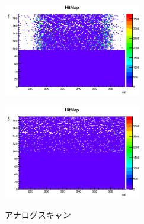 \begin{figure}[h]
  \centering
  \begin{minipage}[b]{0.4\linewidth}
    \centering
    \includegraphics[width=6cm]{./figure/AnalogScan1.png}
    \label{fig:analog1}
  \end{minipage}
  \begin{minipage}[b]{0.4\linewidth}
    \includegraphics[width=6cm]{./figure/AnalogScan3.png}
    \label{fig:analog2}
  \end{minipage}
  \caption{アナログスキャン}
\end{figure}


